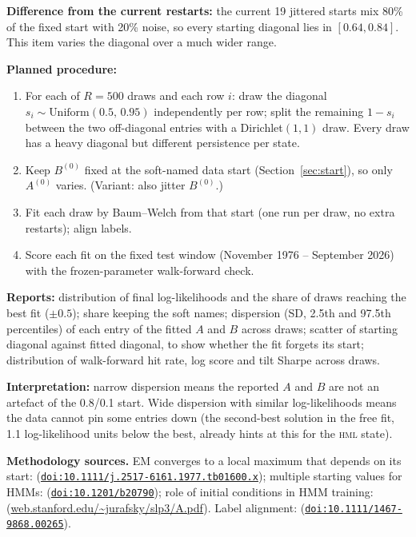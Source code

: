 \documentclass[11pt]{article}
\newcommand{\HML}{\textsc{hml}}
\newcommand{\doi}[1]{\href{https://doi.org/#1}{\nolinkurl{doi:#1}}}
\begin{document}
\textbf{Difference from the current restarts:} the current 19 jittered starts mix 80\% of the fixed start with 20\% noise, so every starting diagonal lies in $[0.64, 0.84]$. This item varies the diagonal over a much wider range.

\textbf{Planned procedure:}
\begin{enumerate}
\item For each of $R=500$ draws and each row $i$: draw the diagonal $s_i\sim\text{Uniform}(0.5,\,0.95)$ independently per row; split the remaining $1-s_i$ between the two off-diagonal entries with a Dirichlet$(1,1)$ draw. Every draw has a heavy diagonal but different persistence per state.
\item Keep $B^{(0)}$ fixed at the soft-named data start (Section~\ref{sec:start}), so only $A^{(0)}$ varies. (Variant: also jitter $B^{(0)}$.)
\item Fit each draw by Baum--Welch from that start (one run per draw, no extra restarts); align labels.
\item Score each fit on the fixed test window (November 1976 -- September 2026) with the frozen-parameter walk-forward check.
\end{enumerate}
\textbf{Reports:} distribution of final log-likelihoods and the share of draws reaching the best fit ($\pm0.5$); share keeping the soft names; dispersion (SD, 2.5th and 97.5th percentiles) of each entry of the fitted $A$ and $B$ across draws; scatter of starting diagonal against fitted diagonal, to show whether the fit forgets its start; distribution of walk-forward hit rate, log score and tilt Sharpe across draws.

\textbf{Interpretation:} narrow dispersion means the reported $A$ and $B$ are not an artefact of the 0.8/0.1 start. Wide dispersion with similar log-likelihoods means the data cannot pin some entries down (the second-best solution in the free fit, 1.1 log-likelihood units below the best, already hints at this for the \HML{} state).

\textbf{Methodology sources.} EM converges to a local maximum that depends on its start: \citet{dempster1977} (\doi{10.1111/j.2517-6161.1977.tb01600.x}); multiple starting values for HMMs: \citet{zucchini2016} (\doi{10.1201/b20790}); role of initial conditions in HMM training: \citet[p.~15]{jurafsky_slp3} (\href{https://web.stanford.edu/~jurafsky/slp3/A.pdf}{web.stanford.edu/\textasciitilde jurafsky/slp3/A.pdf}). Label alignment: \citet{stephens2000} (\doi{10.1111/1467-9868.00265}).
\end{document}
